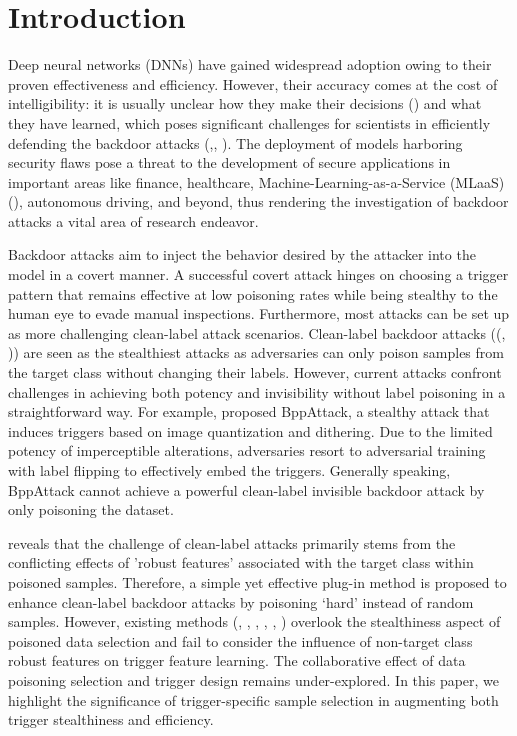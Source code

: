 \documentclass{article}
\begin{document}
\section{Introduction}
Deep neural networks (DNNs) have gained widespread adoption owing to their proven effectiveness and efficiency. However, their accuracy comes at the cost of intelligibility: it is usually unclear how they make their decisions (\citet{radenovic2022neural}) and what they have learned, which poses significant challenges for scientists in efficiently defending the backdoor attacks (\citet{doan2021backdoor},\citet{287378}, \citet{10.1145/3576915.3616617}). The deployment of models harboring security flaws pose a threat to the development of secure applications in important areas like ﬁnance, healthcare, Machine-Learning-as-a-Service (MLaaS)(\citet{huang2024uba}), autonomous driving, and beyond, thus rendering the investigation of backdoor attacks a vital area of research endeavor. 

Backdoor attacks aim to inject the behavior desired by the attacker into the model in a covert manner. A successful covert attack hinges on choosing a trigger pattern that remains effective at low poisoning rates while being stealthy to the human eye to evade manual inspections. Furthermore, most attacks can be set up as more challenging clean-label attack scenarios. Clean-label backdoor attacks ((\citet{huynh2024combat}, \citet{zhao2024exploring})) are seen as the stealthiest attacks as adversaries can only poison samples from the target class without changing their labels. However, current attacks confront challenges in achieving both potency and invisibility without label poisoning in a straightforward way. For example, \citet{wang2022bppattack} proposed BppAttack, a stealthy attack that induces triggers based on image quantization and dithering. Due to the limited potency of imperceptible alterations, adversaries resort to adversarial training with label flipping to effectively embed the triggers. Generally speaking, BppAttack cannot achieve a powerful clean-label invisible backdoor attack by only poisoning the dataset.

\citet{gao2023not} reveals that the challenge of clean-label attacks primarily stems from the conflicting effects of 'robust features' associated with the target class within poisoned samples.  Therefore, a simple yet effective plug-in method is proposed to enhance clean-label backdoor attacks by poisoning ‘hard’ instead of random samples. However, existing methods (\citet{hayase2022few}, \citet{li2023explore}, \citet{li2024proxy}, \citet{hungwicked}, \citet{wang2025not}, \citet{han2024backdooring}) overlook the stealthiness aspect of poisoned data selection and fail to consider the influence of non-target class robust features on trigger feature learning. The collaborative effect of data poisoning selection and trigger design remains under-explored. In this paper, we highlight the significance of trigger-specific sample selection in augmenting both trigger stealthiness and efficiency.
\end{document}
